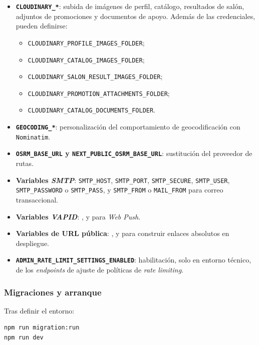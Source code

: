 \begin{itemize}
    \item \textbf{\texttt{CLOUDINARY\_*}}: subida de imágenes de perfil, catálogo, resultados de salón, adjuntos de promociones y documentos de apoyo. Además de las credenciales, pueden definirse:
    \begin{itemize}[nosep]
        \item \texttt{CLOUDINARY\_PROFILE\_IMAGES\_FOLDER};
        \item \texttt{CLOUDINARY\_CATALOG\_IMAGES\_FOLDER};
        \item \texttt{CLOUDINARY\_SALON\_RESULT\_IMAGES\_FOLDER};
        \item \texttt{CLOUDINARY\_PROMOTION\_ATTACHMENTS\_FOLDER};
        \item \texttt{CLOUDINARY\_CATALOG\_DOCUMENTS\_FOLDER}.
    \end{itemize}
    \item \textbf{\texttt{GEOCODING\_*}}: personalización del comportamiento de geocodificación con \texttt{Nominatim}.
    \item \textbf{\texttt{OSRM\_BASE\_URL} y \texttt{NEXT\_PUBLIC\_OSRM\_BASE\_URL}}: sustitución del proveedor de rutas.
    \item \textbf{Variables \textit{SMTP}}: \texttt{SMTP\_HOST}, \texttt{SMTP\_PORT}, \texttt{SMTP\_SECURE}, \texttt{SMTP\_USER}, \texttt{SMTP\_PASSWORD} o \texttt{SMTP\_PASS}, y \texttt{SMTP\_FROM} o \texttt{MAIL\_FROM} para correo transaccional.
    \item \textbf{Variables \textit{VAPID}}: ,  y  para \textit{Web Push}.
    \item \textbf{Variables de URL pública}: ,  y  para construir enlaces absolutos en despliegue.
    \item \textbf{\texttt{ADMIN\_RATE\_LIMIT\_SETTINGS\_ENABLED}}: habilitación, solo en entorno técnico, de los \textit{endpoints} de ajuste de políticas de \textit{rate limiting}.
\end{itemize}

\subsubsection*{Migraciones y arranque}

Tras definir el entorno:

\begin{lstlisting}[language=bash]
npm run migration:run
npm run dev
\end{lstlisting}

